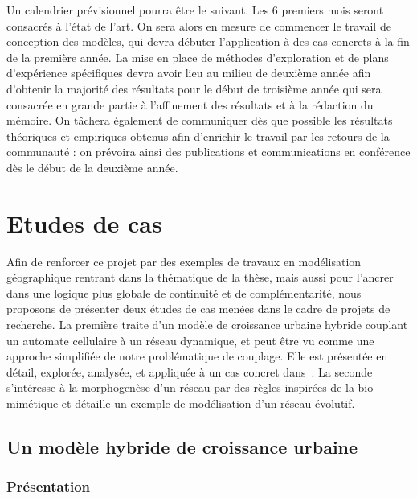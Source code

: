 \documentclass[french,12pt]{article}
\begin{document}
Un calendrier prévisionnel pourra être le suivant. Les 6 premiers
mois seront consacrés à l'état de l'art. On sera alors en mesure de
commencer le travail de conception des modèles, qui devra débuter
l'application à des cas concrets à la fin de la première année. La
mise en place de méthodes d'exploration et de plans d'expérience spécifiques
devra avoir lieu au milieu de deuxième année afin d'obtenir la majorité
des résultats pour le début de troisième année qui sera consacrée
en grande partie à l'affinement des résultats et à la rédaction du
mémoire. On tâchera également de communiquer dès que possible les
résultats théoriques et empiriques obtenus afin d'enrichir le travail
par les retours de la communauté : on prévoira ainsi des publications
et communications en conférence dès le début de la deuxième année.


\section{Etudes de cas}
\label{sec:caseStudy}


Afin de renforcer ce projet par des exemples de travaux en modélisation géographique rentrant dans la thématique de la thèse, mais aussi pour l’ancrer dans une logique plus globale de continuité et de complémentarité, nous proposons de présenter deux études de cas menées dans le cadre de projets de recherche. La première traite d’un modèle de croissance urbaine hybride couplant un automate cellulaire à un réseau dynamique, et peut être vu comme une approche simplifiée de notre problématique de couplage. Elle est présentée en détail, explorée, analysée, et appliquée à un cas concret dans~\cite{raimbault2014hybrid}. La seconde s’intéresse à la morphogenèse d’un réseau par des règles inspirées de la bio-mimétique et détaille un exemple de modélisation d’un réseau évolutif.


\subsection{Un modèle hybride de croissance urbaine}

\subsubsection{Présentation}
\end{document}
